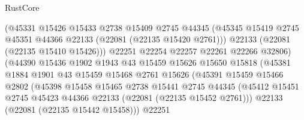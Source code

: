 \begin{lexlean}{RustCore}
\begin{coremodule}
                                (@45331
                                  @15426
                                  @15433
                                  @2738
                                  @15409
                                  @2745
                                  @44345
                                  (@45345
                                    @15419
                                    @2745
                                    @45351
                                    @44366
                                    @22133
                                    (@22081 (@22135 @15420 @2761)))
                                  @22133
                                  (@22081 (@22135 @15410 @15426)))
                                @22251
                                @22254
                                @22257
                                @22261
                                @22266
                                @32806)
                              (@44390
                                @15436
                                @1902
                                @1943
                                @43
                                @15459
                                @15626
                                @15650
                                @15818
                                (@45381
                                  @1884
                                  @1901
                                  @43
                                  @15459
                                  @15468
                                  @2761
                                  @15626
                                  (@45391
                                    @15459
                                    @15466
                                    @2802
                                    (@45398
                                      @15458
                                      @15465
                                      @2738
                                      @15441
                                      @2745
                                      @44345
                                      (@45412
                                        @15451
                                        @2745
                                        @45423
                                        @44366
                                        @22133
                                        (@22081 (@22135 @15452 @2761)))
                                      @22133
                                      (@22081 (@22135 @15442 @15458)))
                                    @22251

\end{coremodule}
\end{lexlean}
